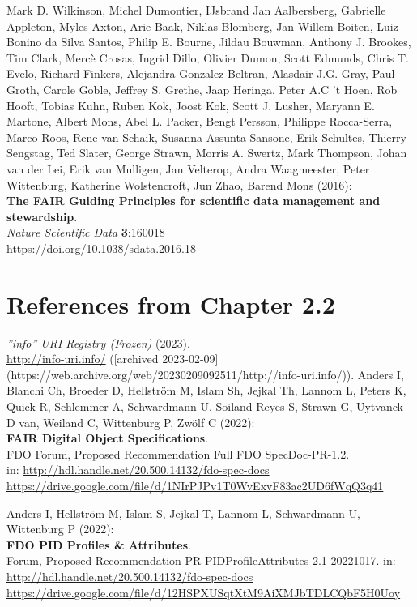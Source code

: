 \begin{thebibliography}{9}
Mark D. Wilkinson, Michel Dumontier, IJsbrand Jan
Aalbersberg, Gabrielle Appleton, Myles Axton, Arie Baak, Niklas
Blomberg, Jan-Willem Boiten, Luiz Bonino da Silva Santos, Philip E.
Bourne, Jildau Bouwman, Anthony J. Brookes, Tim Clark, Mercè Crosas,
Ingrid Dillo, Olivier Dumon, Scott Edmunds, Chris T. Evelo, Richard
Finkers, Alejandra Gonzalez-Beltran, Alasdair J.G. Gray, Paul Groth,
Carole Goble, Jeffrey S. Grethe, Jaap Heringa, Peter A.C 't Hoen, Rob
Hooft, Tobias Kuhn, Ruben Kok, Joost Kok, Scott J. Lusher, Maryann E.
Martone, Albert Mons, Abel L. Packer, Bengt Persson, Philippe
Rocca-Serra, Marco Roos, Rene van Schaik, Susanna-Assunta Sansone, Erik
Schultes, Thierry Sengstag, Ted Slater, George Strawn, Morris A. Swertz,
Mark Thompson, Johan van der Lei, Erik van Mulligen, Jan Velterop, Andra
Waagmeester, Peter Wittenburg, Katherine Wolstencroft, Jun Zhao, Barend
Mons (2016):\\
\textbf{The FAIR Guiding Principles for scientific data management and
stewardship}.\\
\emph{Nature Scientific Data} \textbf{3}:160018\\
\url{https://doi.org/10.1038/sdata.2016.18}


\section{References from Chapter 2.2}

\emph{”info” URI Registry (Frozen)} (2023).  \\
\url{http://info-uri.info/} ([archived 2023-02-09](https://web.archive.org/web/20230209092511/http://info-uri.info/)).
{}
Anders I, Blanchi Ch, Broeder D, Hellström M, Islam Sh, Jejkal Th, Lannom L, Peters K, Quick R, Schlemmer A, Schwardmann U, Soiland-Reyes S, Strawn G, Uytvanck D van, Weiland C, Wittenburg P, Zwölf C (2022):\\
\textbf{FAIR Digital Object Specifications}.\\
FDO Forum, Proposed Recommendation Full FDO SpecDoc-PR-1.2. \\
in: \url{http://hdl.handle.net/20.500.14132/fdo-spec-docs}\\
\url{https://drive.google.com/file/d/1NIrPJPv1T0WvExvF83ac2UD6fWqQ3q41}

Anders I, Hellström M, Islam S, Jejkal T, Lannom L, Schwardmann U, Wittenburg P (2022):\\
\textbf{FDO PID Profiles \& Attributes}.\\
\FDO Forum,  Proposed Recommendation PR-PIDProfileAttributes-2.1-20221017.
in: \url{http://hdl.handle.net/20.500.14132/fdo-spec-docs}\\
\url{https://drive.google.com/file/d/12HSPXUSqtXtM9AiXMJbTDLCQbF5H0Uoy}




\end{thebibliography}
